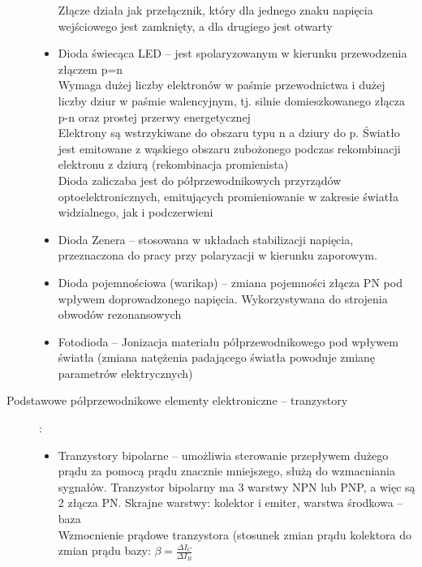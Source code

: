\documentclass[a4paper,11pt]{article}
\begin{document}
\begin{description}
\begin{itemize}
    Złącze działa jak przełącznik, który dla jednego znaku napięcia wejściowego jest zamknięty, a dla drugiego jest otwarty
  \item Dioda świecąca LED -- jest spolaryzowanym w kierunku przewodzenia złączem p=n\\
    Wymaga dużej liczby elektronów w paśmie przewodnictwa i dużej liczby dziur w paśmie walencyjnym, tj. silnie domieszkowanego złącza p-n oraz prostej przerwy energetycznej\\
    Elektrony są wstrzykiwane do obszaru typu n a dziury do p. Światło jest emitowane z wąskiego obszaru zubożonego podczas rekombinacji elektronu z dziurą (rekombinacja promienista)\\
    Dioda zaliczaba jest do półprzewodnikowych przyrządów optoelektronicznych, emitujących promieniowanie w zakresie światła widzialnego, jak i podczerwieni
  \item Dioda Zenera -- stosowana w układach stabilizacji napięcia, przeznaczona do pracy przy polaryzacji w kierunku zaporowym.
  \item Dioda pojemnościowa (warikap) -- zmiana pojemności złącza PN pod wpływem doprowadzonego napięcia. Wykorzystywana do strojenia obwodów rezonansowych
  \item Fotodioda -- Jonizacja materiału półprzewodnikowego pod wpływem światła (zmiana natężenia padającego światła powoduje zmianę parametrów elektrycznych)
  \end{itemize}
\item[Podstawowe półprzewodnikowe elementy elektroniczne -- tranzystory]:
  \begin{itemize}
  \item Tranzystory bipolarne -- umożliwia sterowanie przepływem dużego prądu za pomocą prądu znacznie mniejszego, służą do wzmacniania sygnałów. Tranzystor bipolarny ma 3 warstwy NPN lub PNP, a więc są 2 złącza PN. Skrajne warstwy: kolektor i emiter, warstwa środkowa -- baza\\
    Wzmocnienie prądowe tranzystora (stosunek zmian prądu kolektora do zmian prądu bazy: $\beta = \frac{\Delta I_C}{\Delta I_B}$
  \end{itemize}
\end{description}
\end{document}
